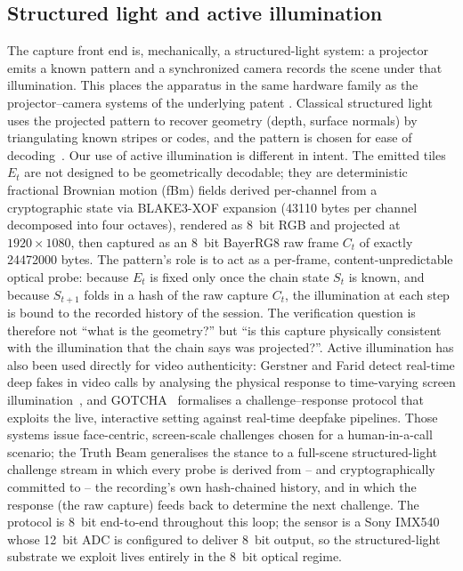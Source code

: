 \subsection{Structured light and active illumination}
The capture front end is, mechanically, a structured-light system: a projector emits a known pattern and a synchronized camera records the scene under that illumination. This places the apparatus in the same hardware family as the projector--camera systems of the underlying patent \cite{patent2025}. Classical structured light uses the projected pattern to recover geometry (depth, surface normals) by triangulating known stripes or codes, and the pattern is chosen for ease of decoding~\cite{geng2011}. Our use of active illumination is different in intent. The emitted tiles $E_t$ are not designed to be geometrically decodable; they are deterministic fractional Brownian motion (fBm) fields derived per-channel from a cryptographic state via BLAKE3-XOF expansion (\num{43110} bytes per channel decomposed into four octaves), rendered as \SI{8}{bit} RGB and projected at $1920\times1080$, then captured as an \SI{8}{bit} BayerRG8 raw frame $C_t$ of exactly \num{24472000} bytes. The pattern's role is to act as a per-frame, content-unpredictable optical probe: because $E_t$ is fixed only once the chain state $S_t$ is known, and because $S_{t+1}$ folds in a hash of the raw capture $C_t$, the illumination at each step is bound to the recorded history of the session. The verification question is therefore not ``what is the geometry?'' but ``is this capture physically consistent with the illumination that the chain says was projected?''. Active illumination has also been used directly for video authenticity: Gerstner and Farid detect real-time deep fakes in video calls by analysing the physical response to time-varying screen illumination~\cite{gerstner2022active}, and GOTCHA~\cite{mittal2024gotcha} formalises a challenge--response protocol that exploits the live, interactive setting against real-time deepfake pipelines. Those systems issue face-centric, screen-scale challenges chosen for a human-in-a-call scenario; the Truth Beam generalises the stance to a full-scene structured-light challenge stream in which every probe is derived from -- and cryptographically committed to -- the recording's own hash-chained history, and in which the response (the raw capture) feeds back to determine the next challenge. The protocol is \SI{8}{bit} end-to-end throughout this loop; the sensor is a Sony IMX540 whose \SI{12}{bit} ADC is configured to deliver \SI{8}{bit} output, so the structured-light substrate we exploit lives entirely in the \SI{8}{bit} optical regime.

